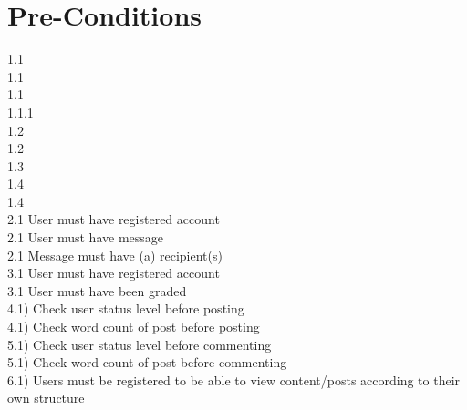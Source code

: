 \documentclass{scrreprt}
\begin{document}
\section{Pre-Conditions}								%
1.1\\
1.1\\
1.1\\
1.1.1\\
1.2\\
1.2\\
1.3\\
1.4\\
1.4\\
2.1 User must have registered account\\
2.1 User must have message\\
2.1 Message must have (a) recipient(s)\\
3.1 User must have registered account\\
3.1 User must have been graded\\
4.1) Check user status level before posting\\
4.1) Check word count of post before posting\\
5.1) Check user status level before commenting\\
5.1) Check word count of post before commenting\\
6.1) Users must be registered to be able to view content/posts according to their own structure\\
\end{document}
